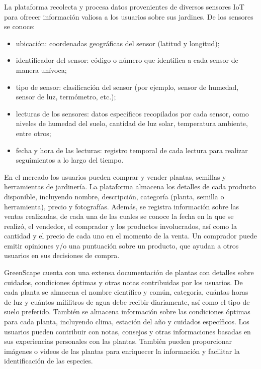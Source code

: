 \documentclass{article}
\begin{document}
La plataforma recolecta y procesa datos provenientes de diversos sensores IoT para ofrecer información valiosa a los usuarios sobre sus jardines. De los sensores se conoce:

\begin{itemize}
    \item ubicaci\'on: coordenadas geogr\'aficas del sensor (latitud y longitud);
    \item identificador del sensor: código o número que identifica a cada sensor de manera unívoca;
    \item tipo de sensor: clasificación del sensor (por ejemplo, sensor de humedad, sensor de luz, termómetro, etc.);
    \item lecturas de los sensores: datos específicos recopilados por cada sensor, como niveles de humedad del suelo, cantidad de luz solar, temperatura ambiente, entre otros;
    \item fecha y hora de las lecturas: registro temporal de cada lectura para realizar seguimientos a lo largo del tiempo.
\end{itemize}

En el mercado los usuarios pueden comprar y vender plantas, semillas y herramientas de jardinería. La plataforma almacena los detalles de cada producto disponible, incluyendo nombre, descripción, categoría (planta, semilla o herramienta), precio y fotografías. Adem\'as, se registra informaci\'on sobre las ventas realizadas, de cada una de las cuales se conoce la fecha en la que se realizó, el vendedor, el comprador y los productos involucrados, así como la cantidad y el precio de cada uno en el momento de la venta. Un comprador puede emitir opiniones y/o una puntuaci\'on sobre un producto, que ayudan a otros usuarios en sus decisiones de compra.

GreenScape cuenta con una extensa documentaci\'on de plantas con detalles sobre cuidados, condiciones óptimas y otras notas contribuidas por los usuarios. De cada planta se almacena el nombre científico y común, categoría, cu\'antas horas de luz y cu\'antos mililitros de agua debe recibir diariamente, as\'i como el tipo de suelo preferido. Tambi\'en se almacena informaci\'on sobre las condiciones \'optimas para cada planta, incluyendo clima, estaci\'on del a\~no y cuidados espec\'ificos. Los usuarios pueden contribuir con notas, consejos y otras informaciones basadas en sus experiencias personales con las plantas. Tambi\'en pueden proporcionar im\'agenes o videos de las plantas para enriquecer la informaci\'on y facilitar la identificaci\'on de las especies.
\end{document}
